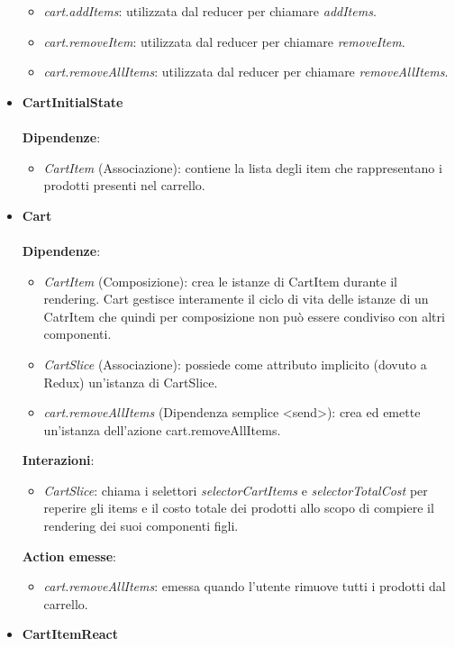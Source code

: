 \begin{itemize}
\begin{itemize}
			\item \textit{cart.addItems}: utilizzata dal reducer per chiamare \textit{addItems}.
			\item \textit{cart.removeItem}: utilizzata dal reducer per chiamare \textit{removeItem}.
			\item \textit{cart.removeAllItems}: utilizzata dal reducer per chiamare \textit{removeAllItems}.
		\end{itemize}
		\item \textbf{CartInitialState}
		\\\\
		\textbf{Dipendenze}: 
		\begin{itemize}
			\item \textit{CartItem} (Associazione): contiene la lista degli item che rappresentano i prodotti presenti nel carrello.
		\end{itemize} 
		\item \textbf{Cart}
		\\\\
		\textbf{Dipendenze}:
		\begin{itemize}
		\item \textit{CartItem} (Composizione): crea le istanze di CartItem durante il rendering.
		Cart gestisce interamente il ciclo di vita delle istanze di un CatrItem che quindi per composizione
		non può essere condiviso con altri componenti.
		\item \textit{CartSlice} (Associazione): possiede come attributo implicito (dovuto a Redux) un'istanza di CartSlice.
		\item \textit{cart.removeAllItems} (Dipendenza semplice \textless send\textgreater): crea ed emette un'istanza dell'azione cart.removeAllItems.
	\end{itemize} 
	\textbf{Interazioni}:
	\begin{itemize}
		\item \textit{CartSlice}: chiama i selettori \textit{selectorCartItems} e \textit{selectorTotalCost} per reperire gli items e il costo totale dei prodotti 
		allo scopo di compiere il rendering dei suoi componenti figli.
	\end{itemize}
	\textbf{Action emesse}:
	\begin{itemize}
		\item \textit{cart.removeAllItems}: emessa quando l'utente rimuove tutti i prodotti dal carrello.
	\end{itemize}
	\item \textbf{CartItemReact}
	\\\\

\end{itemize}
